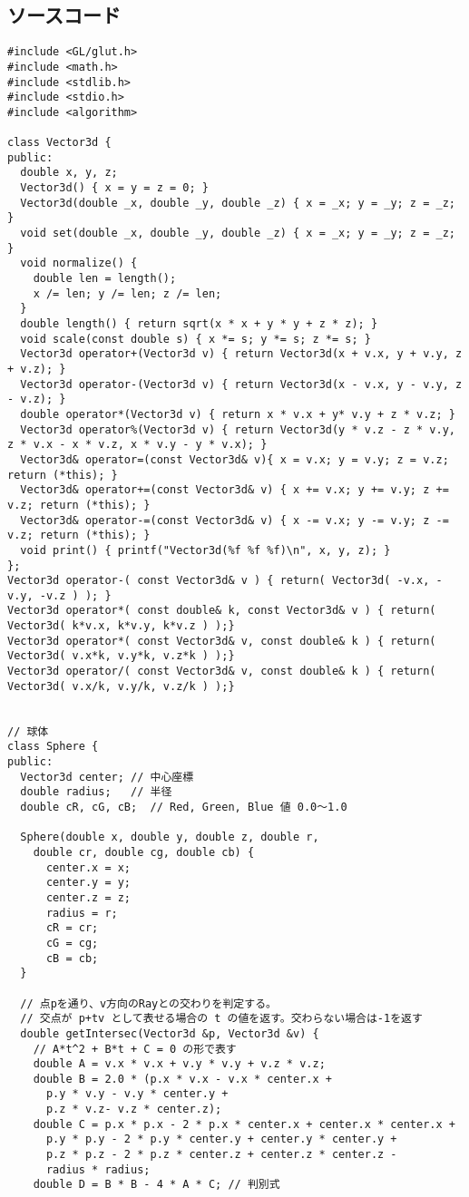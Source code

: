 \documentclass{scrartcl}
\begin{document}
\subsection{ソースコード}
\label{sec:orga853daf}
\begin{verbatim}
#include <GL/glut.h>
#include <math.h>
#include <stdlib.h>
#include <stdio.h>
#include <algorithm>

class Vector3d {
public:
  double x, y, z;
  Vector3d() { x = y = z = 0; }
  Vector3d(double _x, double _y, double _z) { x = _x; y = _y; z = _z; }
  void set(double _x, double _y, double _z) { x = _x; y = _y; z = _z; }
  void normalize() {
    double len = length();
    x /= len; y /= len; z /= len;
  }
  double length() { return sqrt(x * x + y * y + z * z); }
  void scale(const double s) { x *= s; y *= s; z *= s; }
  Vector3d operator+(Vector3d v) { return Vector3d(x + v.x, y + v.y, z + v.z); }
  Vector3d operator-(Vector3d v) { return Vector3d(x - v.x, y - v.y, z - v.z); }
  double operator*(Vector3d v) { return x * v.x + y* v.y + z * v.z; }
  Vector3d operator%(Vector3d v) { return Vector3d(y * v.z - z * v.y, z * v.x - x * v.z, x * v.y - y * v.x); }
  Vector3d& operator=(const Vector3d& v){ x = v.x; y = v.y; z = v.z; return (*this); }
  Vector3d& operator+=(const Vector3d& v) { x += v.x; y += v.y; z += v.z; return (*this); }
  Vector3d& operator-=(const Vector3d& v) { x -= v.x; y -= v.y; z -= v.z; return (*this); }
  void print() { printf("Vector3d(%f %f %f)\n", x, y, z); }
};
Vector3d operator-( const Vector3d& v ) { return( Vector3d( -v.x, -v.y, -v.z ) ); }
Vector3d operator*( const double& k, const Vector3d& v ) { return( Vector3d( k*v.x, k*v.y, k*v.z ) );}
Vector3d operator*( const Vector3d& v, const double& k ) { return( Vector3d( v.x*k, v.y*k, v.z*k ) );}
Vector3d operator/( const Vector3d& v, const double& k ) { return( Vector3d( v.x/k, v.y/k, v.z/k ) );}


// 球体
class Sphere {
public:
  Vector3d center; // 中心座標
  double radius;   // 半径
  double cR, cG, cB;  // Red, Green, Blue 値 0.0〜1.0

  Sphere(double x, double y, double z, double r,
    double cr, double cg, double cb) {
      center.x = x;
      center.y = y;
      center.z = z;
      radius = r;
      cR = cr;
      cG = cg;
      cB = cb;
  }

  // 点pを通り、v方向のRayとの交わりを判定する。
  // 交点が p+tv として表せる場合の t の値を返す。交わらない場合は-1を返す
  double getIntersec(Vector3d &p, Vector3d &v) {
    // A*t^2 + B*t + C = 0 の形で表す
    double A = v.x * v.x + v.y * v.y + v.z * v.z;
    double B = 2.0 * (p.x * v.x - v.x * center.x +
      p.y * v.y - v.y * center.y +
      p.z * v.z- v.z * center.z);
    double C = p.x * p.x - 2 * p.x * center.x + center.x * center.x +
      p.y * p.y - 2 * p.y * center.y + center.y * center.y +
      p.z * p.z - 2 * p.z * center.z + center.z * center.z -
      radius * radius;
    double D = B * B - 4 * A * C; // 判別式


\end{verbatim}
\end{document}
